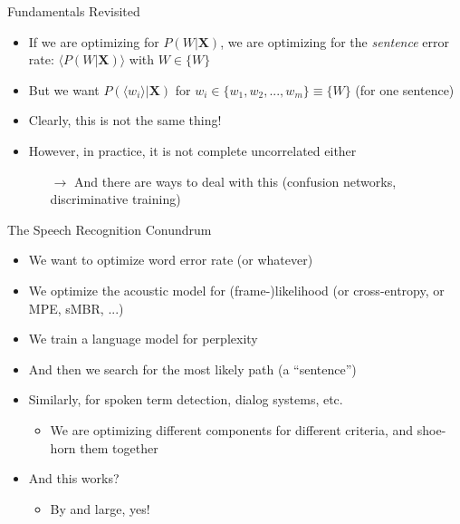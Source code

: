 \begin{frame}{Fundamentals Revisited}
  \begin{itemize}
  \item If we are optimizing for $P(W|\boldsymbol{X})$,
    we are optimizing for the \textit{sentence} error rate: $\langle P(W|\boldsymbol{X}) \rangle$ with $W \in \{W\}$
  \item But we want $P(\langle w_i \rangle|\boldsymbol{X})$ for $w_i \in \{ w_1,w_2, ..., w_m \} \equiv \{W\}$ (for one sentence)
  \item Clearly, this is not the same thing!
  \item However, in practice, it is not complete uncorrelated either
    \begin{itemize}
    \item[$\rightarrow$] And there are ways to deal with this (confusion networks, discriminative training)
    \end{itemize}
  \end{itemize}
\end{frame}

\begin{frame}{The Speech Recognition Conundrum}
  \begin{itemize}
  \item We want to optimize word error rate (or whatever)\\
    \vspace{1cm}
  \item We optimize the acoustic model for (frame-)likelihood (or cross-entropy, or MPE, sMBR, ...)
  \item We train a language model for perplexity
  \item And then we search for the most likely path (a ``sentence'')
  \item Similarly, for spoken term detection, dialog systems, etc.
    \begin{itemize}
    \item We are optimizing different components for different criteria, and shoe-horn them together
    \end{itemize}
  \item And this works?
    \begin{itemize}
    \item By and large, yes!
    \end{itemize}
  \end{itemize}
\end{frame}

